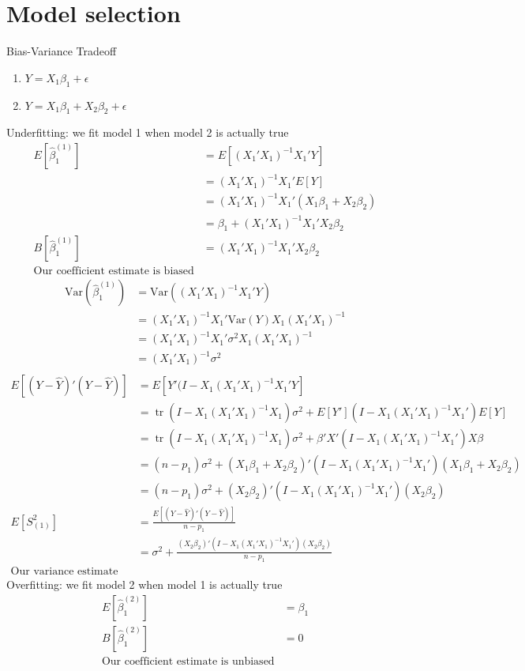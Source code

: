 \documentclass[12pt]{article}\usepackage{graphicx, color}
\theoremstyle{definition}
\newcommand{\Var}{\mathrm{Var}}
\renewcommand{\hat}{\widehat}
\DeclareMathOperator{\tr}{tr}
\begin{document}
\section{Model selection}
Bias-Variance Tradeoff
\begin{enumerate}
\item $Y=X_1\beta_1 +\epsilon$
\item $Y=X_1\beta_1+X_2\beta_2 +\epsilon$
\end{enumerate}
Underfitting: we fit model 1 when model 2 is actually true
\begin{align*}E[\hat \beta_1^{(1)}]&=E[(X_1'X_1)^{-1}X_1'Y]\\
&=(X_1'X_1)^{-1}X_1'E[Y]\\
&=(X_1'X_1)^{-1}X_1'(X_1\beta_1+X_2\beta_2)\\
&=\beta_1+(X_1'X_1)^{-1}X_1'X_2\beta_2\\
B[\hat \beta_1^{(1)}]&=(X_1'X_1)^{-1}X_1'X_2\beta_2\\
\text{Our coefficient estimate is biased}&
\end{align*}
\begin{align*}\Var(\hat \beta_1^{(1)})&=\Var((X_1'X_1)^{-1}X_1'Y)\\
&=(X_1'X_1)^{-1}X_1' \Var(Y)X_1(X_1'X_1)^{-1}\\
&=(X_1'X_1)^{-1}X_1' \sigma^2 X_1(X_1'X_1)^{-1}\\
&=(X_1'X_1)^{-1}\sigma^2\\
\end{align*}
\begin{align*}E[(Y-\hat Y)'(Y-\hat Y)]&= E[Y'(I-X_1(X_1'X_1)^{-1}X_1'Y]\\
&= \tr(I-X_1(X_1'X_1)^{-1}X_1)\sigma^2+E[Y'](I-X_1(X_1'X_1)^{-1}X_1')E[Y]\\
&= \tr(I-X_1(X_1'X_1)^{-1}X_1)\sigma^2+\beta'X'(I-X_1(X_1'X_1)^{-1}X_1')X\beta\\
&= (n-p_1)\sigma^2+(X_1\beta_1+X_2\beta_2)'(I-X_1(X_1'X_1)^{-1}X_1')(X_1\beta_1+X_2\beta_2)\\
&= (n-p_1)\sigma^2+(X_2\beta_2)'(I-X_1(X_1'X_1)^{-1}X_1')(X_2\beta_2)\\
E[S_{(1)}^2]&=\frac{E[(Y-\hat Y)'(Y-\hat Y)]}{n-p_1}\\
&=\sigma^2+\frac{(X_2\beta_2)'(I-X_1(X_1'X_1)^{-1}X_1')(X_2\beta_2)}{n-p_1}\\
\text{Our variance estimate is biased}&
\end{align*}
Overfitting: we fit model 2 when model 1 is actually true
\begin{align*}E[\hat \beta_1^{(2)}]&=\beta_1\\
B[\hat \beta_1^{(2)}]&=0\\
\text{Our coefficient estimate is unbiased}&
\end{align*}
\end{document}
